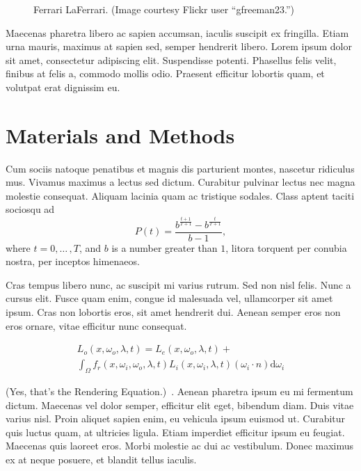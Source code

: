 \documentclass[sigconf,review,anonymous]{acmart}
\begin{document}
\begin{figure}[ht]
  \centering
  \caption{Ferrari LaFerrari. (Image courtesy Flickr user ``gfreeman23.'')}
  \label{fig:ferrari}
\end{figure}

Maecenas pharetra libero ac sapien accumsan, iaculis suscipit ex fringilla. Etiam urna mauris, maximus at sapien sed, semper hendrerit libero. Lorem ipsum dolor sit amet, consectetur adipiscing elit. Suspendisse potenti. Phasellus felis velit, finibus at felis a, commodo mollis odio. Praesent efficitur lobortis quam, et volutpat erat dignissim eu. 

\section{Materials and Methods}

Cum sociis natoque penatibus et magnis dis parturient montes, nascetur ridiculus mus. Vivamus maximus a lectus sed dictum. Curabitur pulvinar lectus nec magna molestie consequat. Aliquam lacinia quam ac tristique sodales. Class aptent taciti sociosqu ad 
\begin{equation}
\label{eqn:01}
P(t)=\frac{b^{\frac{t+1}{T+1}}-b^{\frac{t}{T+1}}}{b-1},
\end{equation}
where $t=0,{\ldots}\,,T$, and $b$ is a number greater than $1$, litora torquent per conubia nostra, per inceptos himenaeos.

Cras tempus libero nunc, ac suscipit mi varius rutrum. Sed non nisl felis. Nunc a cursus elit. Fusce quam enim, congue id malesuada vel, ullamcorper sit amet ipsum. Cras non lobortis eros, sit amet hendrerit dui. Aenean semper eros non eros ornare, vitae efficitur nunc consequat. 

\begin{multline}
\label{the-rendering-equation}
L_o(x, \omega_o, \lambda, t) = L_e(x, \omega_o, \lambda, t)  + \\
\int_{\Omega} f_r(x, \omega_i, \omega_o, \lambda, t) L_i(x, \omega_i, \lambda, t)(\omega_i \cdot n) \text{d} \omega_i
\end{multline}

(Yes, that's the Rendering Equation.)~\cite{Kajiya:1986:RE:15922.15902}. Aenean pharetra ipsum eu mi fermentum dictum. Maecenas vel dolor semper, efficitur elit eget, bibendum diam. Duis vitae varius nisl. Proin aliquet sapien enim, eu vehicula ipsum euismod ut. Curabitur quis luctus quam, at ultricies ligula. Etiam imperdiet efficitur ipsum eu feugiat. Maecenas quis laoreet eros. Morbi molestie ac dui ac vestibulum. Donec maximus ex at neque posuere, et blandit tellus iaculis.
\end{document}
